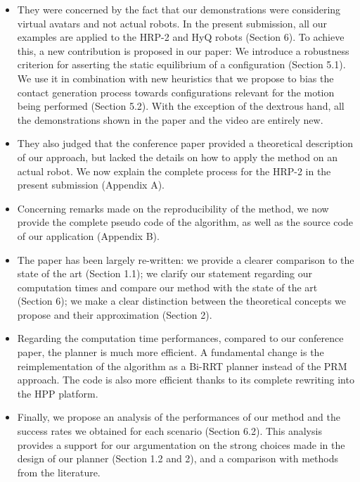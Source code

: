 \documentclass[a4paper]{article}
\begin{document}
\begin{itemize}
\item They were concerned by the fact that our demonstrations were
considering virtual avatars and not actual robots. In the present
submission, all our examples are applied to the HRP-2 and HyQ robots (Section 6).
To achieve this, a new contribution is proposed in our paper:
We introduce a robustness criterion for asserting the static equilibrium
of a configuration (Section 5.1). We use it in combination with new heuristics that we
propose to bias the contact generation process towards configurations
relevant for the motion being performed (Section 5.2).
With the exception of the dextrous hand, all the demonstrations shown in
the paper and the video are entirely new.

\item They also judged that the conference paper provided a theoretical
description of our approach, but lacked the details on how to apply
the method on an actual robot. We now explain the complete process
for the HRP-2 in the present submission (Appendix A).

\item Concerning remarks made on the reproducibility of the method,
we now provide the complete pseudo code of the algorithm, as well as the
source code of our application (Appendix B).

\item The paper has been largely re-written: we provide a clearer
comparison to the state of the art (Section 1.1); we clarify our statement regarding
our computation times and compare our method with the state of the art (Section 6); we make a clear distinction between the
theoretical concepts we propose and their approximation (Section 2).

\item Regarding the computation time performances, compared to our conference paper, the planner is much more efficient.
A fundamental change is the reimplementation of the algorithm as a Bi-RRT planner instead of the PRM
approach. The code is also more efficient thanks to its complete rewriting into the HPP platform.

\item Finally, we propose an analysis of the performances of our method and
the success rates we obtained for each scenario (Section 6.2). This analysis provides
a support for our argumentation on the strong choices made in the design
of our planner (Section 1.2 and 2), and a comparison with methods from the literature.
\end{itemize}
\end{document}
